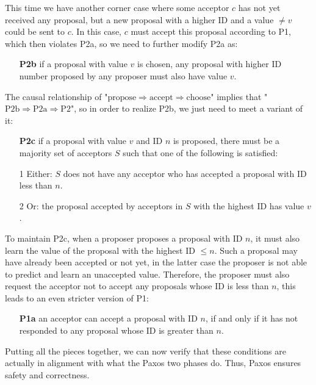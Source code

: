 \documentclass[11pt]{article}
\begin{document}
    This time we have another corner case where some acceptor $c$ has not yet received any proposal, but a new proposal with a higher {\footnotesize ID} and a value $\neq v$ could be sent to $c$. In this case, $c$ must accept this proposal according to P1, which then violates P2a, so we need to further modify P2a as:
    \begin{itemize}
      \item[\textbf{P2b}] if a proposal with value $v$ is chosen, any proposal with higher {\footnotesize ID} number proposed by any proposer must also have value $v$.
    \end{itemize}
    The causal relationship of "$\text{propose}\Rightarrow\text{accept}\Rightarrow\text{choose}$" implies that "$\text{P2b}\Rightarrow\text{P2a}\Rightarrow\text{P2}$", so in order to realize P2b, we just need to meet a variant of it:
    \begin{itemize}
      \item[\textbf{P2c}] if a proposal with value $v$ and {\footnotesize ID} $n$ is proposed, there must be a majority set of acceptors $S$ such that one of the following is satisfied:
      \item[1] Either: $S$ does not have any acceptor who has accepted a proposal with {\footnotesize ID} less than $n$.
      \item[2] Or: the proposal accepted by acceptors in $S$ with the highest {\footnotesize ID} has value $v$.
    \end{itemize}
    To maintain P2c, when a proposer proposes a proposal with {\footnotesize ID} $n$, it must also learn the value of the proposal with the highest {\footnotesize ID} $\le n$. Such a proposal may have already been accepted or not yet, in the latter case the proposer is not able to predict and learn an unaccepted value. Therefore, the proposer must also request the acceptor not to accept any proposals whose {\footnotesize ID} is less than $n$, this leads to an even stricter version of P1:
    \begin{itemize}
      \item[\textbf{P1a}] an acceptor can accept a proposal with {\footnotesize ID} $n$, if and only if it has not responded to any proposal whose {\footnotesize ID} is greater than $n$.
    \end{itemize}
    Putting all the pieces together, we can now verify that these conditions are actually in alignment with what the Paxos two phases do. Thus, Paxos ensures safety and correctness.
\end{document}
